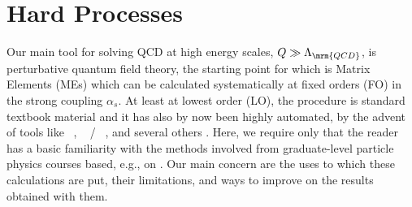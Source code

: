 \section{Hard Processes\label{sec:pQCD}}
%
Our main tool for solving QCD at high energy scales, 
$Q\gg \Lambda_{\mrm{QCD}}$, is
perturbative quantum field theory, the starting point for which is
Matrix Elements (MEs) which can be calculated systematically at fixed
orders (FO) in the strong coupling $\alpha_s$. 
At least at lowest order (LO), the procedure is
standard textbook material \cite{Peskin:1995ev} and it has also by now been
highly automated, by the advent of tools like 
\Mg~\cite{Alwall:2011uj}, 
\Ca~\cite{Pukhov:2004ca} / 
\Co~\cite{Boos:2004kh}, and several others
\cite{Kanaki:2000ey,Krauss:2001iv,Moretti:2001zz,Kilian:2007gr,Cafarella:2007pc,Bahr:2008pv,Gleisberg:2008fv}.  
Here, we  require only that the reader has a
basic familiarity with the methods involved from graduate-level particle
physics courses based, e.g., on \cite{Peskin:1995ev,Dissertori:2003pj}. 
Our main concern are the uses to which these calculations 
are put, their limitations, and ways to improve on the results obtained
with them.

